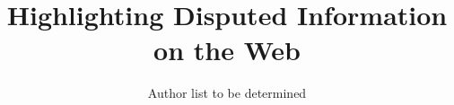 \documentclass{www2010-submission}
\begin{document}
\toappear



\title{Highlighting Disputed Information on the Web}



\author{
	Author list to be determined
}

%


\maketitle

\end{document}
